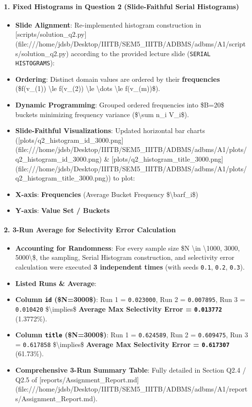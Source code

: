 \documentclass[11pt,a4paper]{article}
\begin{document}
\paragraph{1. Fixed Histograms in Question 2 (Slide-Faithful Serial Histograms)}
\begin{itemize}
\item \textbf{Slide Alignment}: Re-implemented histogram construction in [scripts/solution\_q2.py](file:///home/jdsb/Desktop/IIITB/SEM5\_IIITB/ADBMS/adbms/A1/scripts/solution\_q2.py) according to the provided lecture slide (\texttt{SERIAL HISTOGRAMS}):
\item \textbf{Ordering}: Distinct domain values are ordered by their \textbf{frequencies} (\$f(v\_{(1)}) \textbackslash{}le f(v\_{(2)}) \textbackslash{}le \textbackslash{}dots \textbackslash{}le f(v\_{(m)})\$).
\item \textbf{Dynamic Programming}: Grouped ordered frequencies into \$B=20\$ buckets minimizing frequency variance (\$\textbackslash{}sum n\_i V\_i\$).
\item \textbf{Slide-Faithful Visualizations}: Updated horizontal bar charts ([plots/q2\_histogram\_id\_3000.png](file:///home/jdsb/Desktop/IIITB/SEM5\_IIITB/ADBMS/adbms/A1/plots/q2\_histogram\_id\_3000.png) \& [plots/q2\_histogram\_title\_3000.png](file:///home/jdsb/Desktop/IIITB/SEM5\_IIITB/ADBMS/adbms/A1/plots/q2\_histogram\_title\_3000.png)) to plot:
\item \textbf{X-axis}: \textbf{Frequencies} (Average Bucket Frequency \$\textbackslash{}bar{f}\_i\$)
\item \textbf{Y-axis}: \textbf{Value Set / Buckets}
\end{itemize}

\paragraph{2. 3-Run Average for Selectivity Error Calculation}
\begin{itemize}
\item \textbf{Accounting for Randomness}: For every sample size \$N \textbackslash{}in \textbackslash{}{1000, 3000, 5000\textbackslash{}}\$, the sampling, Serial Histogram construction, and selectivity error calculation were executed \textbf{3 independent times} (with seeds \texttt{0.1}, \texttt{0.2}, \texttt{0.3}).
\item \textbf{Listed Runs \& Average}:
\item \textbf{Column \texttt{id} (\$N=3000\$)}: Run 1 = \texttt{0.023000}, Run 2 = \texttt{0.007895}, Run 3 = \texttt{0.010420} \$\textbackslash{}implies\$ \textbf{Average Max Selectivity Error = \texttt{0.013772}} (1.3772\%).
\item \textbf{Column \texttt{title} (\$N=3000\$)}: Run 1 = \texttt{0.624589}, Run 2 = \texttt{0.609475}, Run 3 = \texttt{0.617858} \$\textbackslash{}implies\$ \textbf{Average Max Selectivity Error = \texttt{0.617307}} (61.73\%).
\item \textbf{Comprehensive 3-Run Summary Table}: Fully detailed in Section Q2.4 / Q2.5 of [reports/Assignment\_Report.md](file:///home/jdsb/Desktop/IIITB/SEM5\_IIITB/ADBMS/adbms/A1/reports/Assignment\_Report.md).
\end{itemize}
\end{document}
